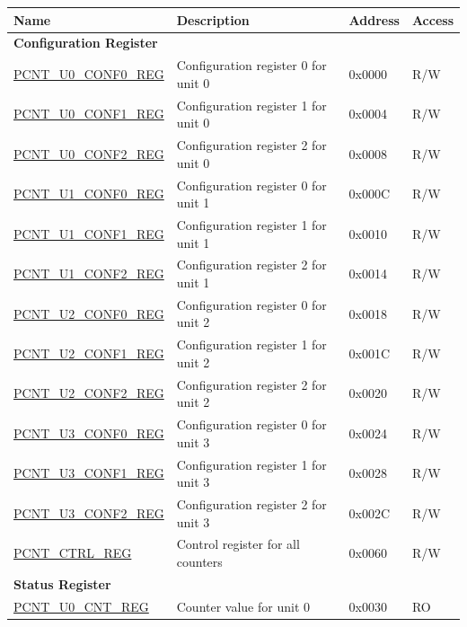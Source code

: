 \begin{longtable}{ | p{6cm} | p{7.2cm} | p{1.3cm} | p{1cm} | }
\hline\rowcolor{lightgray}
Name & Description &  Address & Access \\ \hline
\endhead
\multicolumn{4}{|l|}{\textbf{Configuration Register}} \\ \hline
\hyperref[regdesc:PCNTUNCONF0REG]{PCNT\_U0\_CONF0\_REG} & Configuration register 0 for unit 0 & 0x0000 & R/W \\ \hline
\hyperref[regdesc:PCNTUNCONF1REG]{PCNT\_U0\_CONF1\_REG} & Configuration register 1 for unit 0 & 0x0004 & R/W \\ \hline
\hyperref[regdesc:PCNTUNCONF2REG]{PCNT\_U0\_CONF2\_REG} & Configuration register 2 for unit 0 & 0x0008 & R/W \\ \hline
\hyperref[regdesc:PCNTUNCONF0REG]{PCNT\_U1\_CONF0\_REG} & Configuration register 0 for unit 1 & 0x000C & R/W \\ \hline
\hyperref[regdesc:PCNTUNCONF1REG]{PCNT\_U1\_CONF1\_REG} & Configuration register 1 for unit 1 & 0x0010 & R/W \\ \hline
\hyperref[regdesc:PCNTUNCONF2REG]{PCNT\_U1\_CONF2\_REG} & Configuration register 2 for unit 1 & 0x0014 & R/W \\ \hline
\hyperref[regdesc:PCNTUNCONF0REG]{PCNT\_U2\_CONF0\_REG} & Configuration register 0 for unit 2 & 0x0018 & R/W \\ \hline
\hyperref[regdesc:PCNTUNCONF1REG]{PCNT\_U2\_CONF1\_REG} & Configuration register 1 for unit 2 & 0x001C & R/W \\ \hline
\hyperref[regdesc:PCNTUNCONF2REG]{PCNT\_U2\_CONF2\_REG} & Configuration register 2 for unit 2 & 0x0020 & R/W \\ \hline
\hyperref[regdesc:PCNTUNCONF0REG]{PCNT\_U3\_CONF0\_REG} & Configuration register 0 for unit 3 & 0x0024 & R/W \\ \hline
\hyperref[regdesc:PCNTUNCONF1REG]{PCNT\_U3\_CONF1\_REG} & Configuration register 1 for unit 3 & 0x0028 & R/W \\ \hline
\hyperref[regdesc:PCNTUNCONF2REG]{PCNT\_U3\_CONF2\_REG} & Configuration register 2 for unit 3 & 0x002C & R/W \\ \hline
\hyperref[regdesc:PCNTCTRLREG]{PCNT\_CTRL\_REG} & Control register for all counters & 0x0060 & R/W \\ \hline
\multicolumn{4}{|l|}{\textbf{Status Register}} \\ \hline
\hyperref[regdesc:PCNTUNCNTREG]{PCNT\_U0\_CNT\_REG} & Counter value for unit 0 & 0x0030 & RO \\ \hline

\end{longtable}
